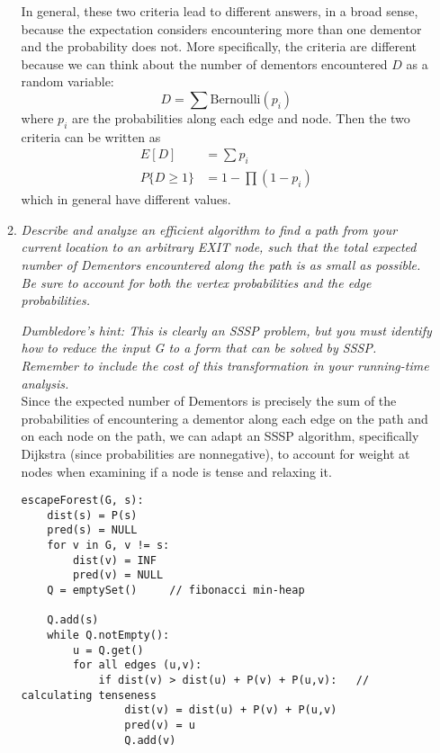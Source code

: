 \documentclass[12pt]{article}
\begin{document}
\begin{enumerate}
\begin{enumerate}
        In general, these two criteria lead to different answers, in a broad sense, because the expectation considers encountering more than one dementor and 
the probability does not. More specifically, the criteria are different because we can think about the number of dementors encountered $D$ as a random 
variable:
        \[
            D = \sum \text{Bernoulli}(p_i)
        \]
        where $p_i$ are the probabilities along each edge and node. Then the two criteria can be written as
        \begin{align*}
            E[D] &= \sum p_i\\
            P\{D \geq 1\} &= 1 - \prod (1-p_i)
        \end{align*}
        which in general have different values.\\
        
        
        \item \textit{Describe and analyze an efficient algorithm to find a path from your current location to an arbitrary EXIT node, such that the total 
expected number of Dementors encountered along the path is as small as possible. Be sure to account for both the vertex probabilities and the edge 
probabilities.}
        
        \textit{Dumbledore's hint: This is clearly an SSSP problem, but you must identify how to reduce the input G to a form that can be solved by SSSP. 
Remember to include the cost of this transformation in your running-time analysis.}\\
        
        Since the expected number of Dementors is precisely the sum of the probabilities of encountering a dementor along each edge on the path and on each 
node on the path, we can adapt an SSSP algorithm, specifically Dijkstra (since probabilities are nonnegative), to account for weight at nodes when examining 
if a node is tense and relaxing it.
         
        \begin{small}
        \begin{verbatim}
escapeForest(G, s):
    dist(s) = P(s)
    pred(s) = NULL
    for v in G, v != s:
        dist(v) = INF
        pred(v) = NULL
    Q = emptySet()     // fibonacci min-heap
    
    Q.add(s)
    while Q.notEmpty():
        u = Q.get()
        for all edges (u,v):
            if dist(v) > dist(u) + P(v) + P(u,v):   // calculating tenseness
                dist(v) = dist(u) + P(v) + P(u,v)
                pred(v) = u
                Q.add(v)
        \end{verbatim}
        \end{small}
        

\end{enumerate}
\end{enumerate}
\end{document}
